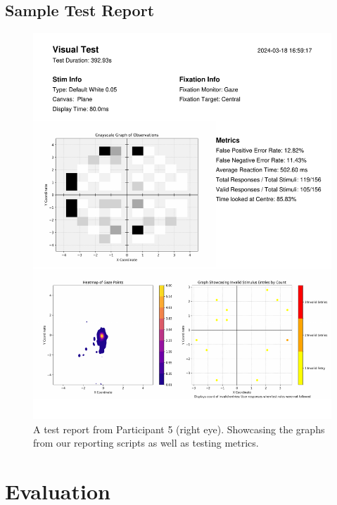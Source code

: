 \documentclass{l4proj}
\begin{document}
\begin{appendices}
\subsection{Sample Test Report} \label{appendix:Sample_report}
\begin{figure}[htbp]
    \centering
    \includegraphics[width=0.8\linewidth]{dissertation/images/test_results.pdf}    

    \caption{A test report from Participant 5 (right eye). Showcasing the graphs from our reporting scripts as well as testing metrics.}
\end{figure}
\newpage
\section{Evaluation}

\end{appendices}
\end{document}
